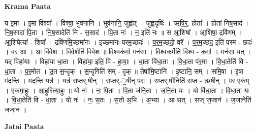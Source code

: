 \documentclass[17pt]{extarticle}
\begin{document}
\textbf{Krama Paata} \newline

य इ॒मा । इ॒मा विश्वा᳚ । विश्वा॒ भुव॑नानि । भुव॑नानि॒ जुह्व॑त् । जुह्व॒दृषिः॑ । ऋषि॒र्॒. होता᳚ । होता॑ निष॒साद॑ । नि॒ष॒सादा॑ पि॒ता । नि॒ष॒सादेति॑ नि - स॒साद॑ । पि॒ता नः॑ । न॒ इति॑ नः ॥ स आ॒शिषा᳚ । आ॒शिषा॒ द्रवि॑णम् । आ॒शिषेत्या᳚ - शिषा᳚ । द्रवि॑णमि॒च्छमा॑नः । इ॒च्छमा॑नः परम॒च्छदः॑ । प॒र॒म॒च्छदो॒ वरे᳚ । प॒र॒म॒च्छद॒ इति॑ परम - छदः॑ । वर॒ आ । आ वि॑वेश । वि॒वे॒शेति॑ विवेश ॥ वि॒श्वक॑र्मा॒ मन॑सा । वि॒श्वक॒र्मेति॑ वि॒श्व - क॒र्मा॒ । मन॑सा॒ यत् । यद् विहा॑याः । विहा॑या धा॒ता । विहा॑या॒ इति॒ वि - हा॒याः॒ । धा॒ता वि॑धा॒ता । वि॒धा॒ता प॑र॒मा । वि॒धा॒तेति॑ वि - धा॒ता । प॒र॒मोत । उ॒त स॒न्दृक् । स॒न्दृगिति॑ सम् - दृक् ॥ तेषा॑मि॒ष्टानि॑ । इ॒ष्टानि॒ सम् । समि॒षा । इ॒षा म॑दन्ति । म॒द॒न्ति॒ यत्र॑ । यत्र॑ सप्त॒र्॒.षीन् । स॒प्त॒र्.॒षीन् प॒रः । स॒प्त॒र्॒.षीनिति॑ सप्त - ऋ॒षीन् । प॒र एक᳚म् । एक॑मा॒हुः । आ॒हुरित्या॒हुः ॥ यो नः॑ । नः॒ पि॒ता । पि॒ता ज॑नि॒ता । ज॒नि॒ता यः । यो वि॑धा॒ता । वि॒धा॒ता यः । वि॒धा॒तेति॑ वि - धा॒ता । यो नः॑ । नः॒ स॒तः । स॒तो अ॒भि । अ॒भ्या । आ सत् । सज् ज॒जान॑ । ज॒जानेति॑ ज॒जान॑ । \newline

\textbf{Jatai Paata} \newline
\end{document}
